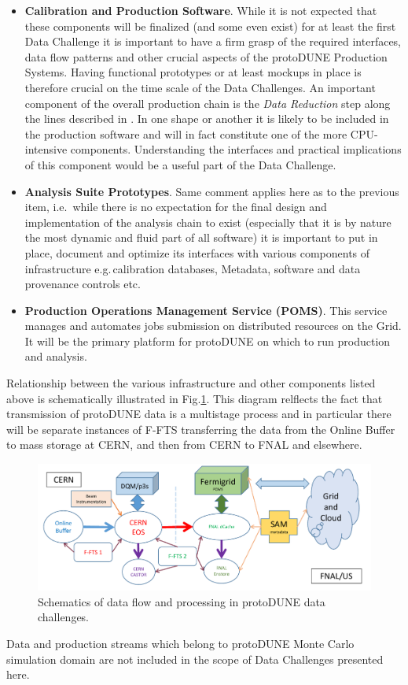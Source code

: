 \documentclass[pdftex,12pt,letter]{article}
\newcommand{\pd}{protoDUNE\xspace}
\begin{document}
\begin{itemize}
\item \textbf{Calibration and Production Software}. While it is not expected that these components will be finalized
(and some even exist) for at least the first Data
Challenge it is important to have a firm grasp of the required interfaces, data flow patterns and other crucial aspects of
the \pd Production Systems. Having functional prototypes or at least mockups  in place is therefore crucial on the time
scale of the Data Challenges.
An important component of the overall production chain is the \textit{Data Reduction} step along the lines described
in \cite{docdb2089}. In one shape or another it is likely to be included in the production software and will in fact constitute
one of the more CPU-intensive components. Understanding the interfaces and practical implications of this component would
be a useful part of the Data Challenge.

\item \textbf{Analysis Suite Prototypes}. Same comment applies here as to the previous item, i.e.\, while there is no expectation
for the final design and implementation of the analysis chain to exist (especially that it is by nature the most dynamic and
fluid part of all software) it is important to put in place, document and optimize its interfaces with various components
of infrastructure e.g.\,calibration databases, Metadata, software and data provenance controls etc.

\item \textbf{Production Operations Management Service (POMS)}. This service \cite{poms} manages and automates jobs
submission on distributed resources on the Grid. It will be the primary platform for \pd on which to run production and analysis.


\end{itemize}
\noindent Relationship between the various infrastructure and other components listed above is schematically illustrated in
Fig.\ref{fig:dc1}. This diagram relflects the fact that transmission of \pd data is a multistage process and in particular there
will be separate instances of F-FTS transferring the data from the Online Buffer to mass storage at CERN, and then from
CERN to FNAL and elsewhere.

\begin{figure}[tbh]
  \centering
  \includegraphics[width=1.0\textwidth]{figures/data_challenge_1.pdf}
  \caption{Schematics of data flow and  processing in \pd data challenges.}
  \label{fig:dc1}
\end{figure}
\noindent Data and production streams which belong to \pd Monte Carlo simulation domain are not included in the
scope of Data Challenges presented here.
\end{document}
